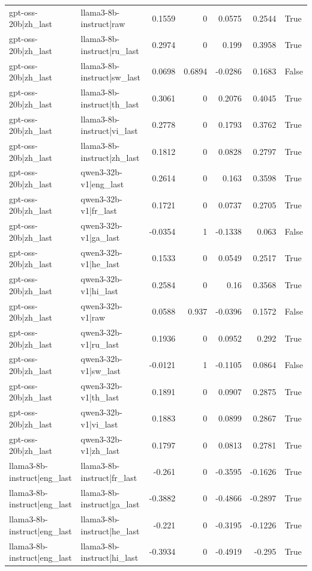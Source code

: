 \begin{table}
\begin{tabular}{l l r r r r l}
gpt-oss-20b|zh_last & llama3-8b-instruct|raw & 0.1559 & 0 & 0.0575 & 0.2544 & True \\
gpt-oss-20b|zh_last & llama3-8b-instruct|ru_last & 0.2974 & 0 & 0.199 & 0.3958 & True \\
gpt-oss-20b|zh_last & llama3-8b-instruct|sw_last & 0.0698 & 0.6894 & -0.0286 & 0.1683 & False \\
gpt-oss-20b|zh_last & llama3-8b-instruct|th_last & 0.3061 & 0 & 0.2076 & 0.4045 & True \\
gpt-oss-20b|zh_last & llama3-8b-instruct|vi_last & 0.2778 & 0 & 0.1793 & 0.3762 & True \\
gpt-oss-20b|zh_last & llama3-8b-instruct|zh_last & 0.1812 & 0 & 0.0828 & 0.2797 & True \\
gpt-oss-20b|zh_last & qwen3-32b-v1|eng_last & 0.2614 & 0 & 0.163 & 0.3598 & True \\
gpt-oss-20b|zh_last & qwen3-32b-v1|fr_last & 0.1721 & 0 & 0.0737 & 0.2705 & True \\
gpt-oss-20b|zh_last & qwen3-32b-v1|ga_last & -0.0354 & 1 & -0.1338 & 0.063 & False \\
gpt-oss-20b|zh_last & qwen3-32b-v1|he_last & 0.1533 & 0 & 0.0549 & 0.2517 & True \\
gpt-oss-20b|zh_last & qwen3-32b-v1|hi_last & 0.2584 & 0 & 0.16 & 0.3568 & True \\
gpt-oss-20b|zh_last & qwen3-32b-v1|raw & 0.0588 & 0.937 & -0.0396 & 0.1572 & False \\
gpt-oss-20b|zh_last & qwen3-32b-v1|ru_last & 0.1936 & 0 & 0.0952 & 0.292 & True \\
gpt-oss-20b|zh_last & qwen3-32b-v1|sw_last & -0.0121 & 1 & -0.1105 & 0.0864 & False \\
gpt-oss-20b|zh_last & qwen3-32b-v1|th_last & 0.1891 & 0 & 0.0907 & 0.2875 & True \\
gpt-oss-20b|zh_last & qwen3-32b-v1|vi_last & 0.1883 & 0 & 0.0899 & 0.2867 & True \\
gpt-oss-20b|zh_last & qwen3-32b-v1|zh_last & 0.1797 & 0 & 0.0813 & 0.2781 & True \\
llama3-8b-instruct|eng_last & llama3-8b-instruct|fr_last & -0.261 & 0 & -0.3595 & -0.1626 & True \\
llama3-8b-instruct|eng_last & llama3-8b-instruct|ga_last & -0.3882 & 0 & -0.4866 & -0.2897 & True \\
llama3-8b-instruct|eng_last & llama3-8b-instruct|he_last & -0.221 & 0 & -0.3195 & -0.1226 & True \\
llama3-8b-instruct|eng_last & llama3-8b-instruct|hi_last & -0.3934 & 0 & -0.4919 & -0.295 & True \\

\end{tabular}
\end{table}
